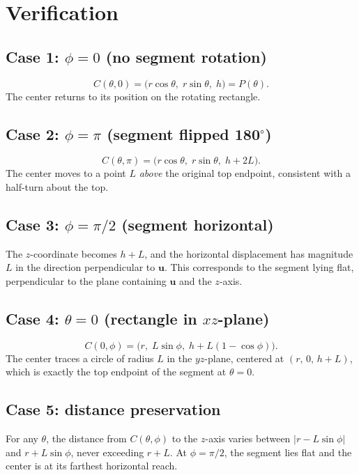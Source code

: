 \documentclass[12pt,a4paper]{article}
\begin{document}
\section{Verification}\label{sec:verify}

\subsection*{Case 1: $\phi = 0$ (no segment rotation)}

\[
C(\theta, 0) = \big( r\cos\theta,\; r\sin\theta,\; h \big) = P(\theta).
\]
The center returns to its position on the rotating rectangle. 

\subsection*{Case 2: $\phi = \pi$ (segment flipped 180$^\circ$)}

\[
C(\theta, \pi) = \big( r\cos\theta,\; r\sin\theta,\; h+2L \big).
\]
The center moves to a point $L$ \emph{above} the original top endpoint,
consistent with a half-turn about the top. 

\subsection*{Case 3: $\phi = \pi/2$ (segment horizontal)}

The $z$-coordinate becomes $h + L$, and the horizontal displacement has
magnitude $L$ in the direction perpendicular to $\mathbf{u}$.
This corresponds to the segment lying flat, perpendicular to the plane
containing $\mathbf{u}$ and the $z$-axis. 

\subsection*{Case 4: $\theta = 0$ (rectangle in $xz$-plane)}

\[
C(0, \phi) = \big( r,\; L\sin\phi,\; h + L(1-\cos\phi) \big).
\]
The center traces a circle of radius $L$ in the $yz$-plane, centered at $(r,\,0,\,h+L)$,
which is exactly the top endpoint of the segment at $\theta=0$. 

\subsection*{Case 5: distance preservation}

For any $\theta$, the distance from $C(\theta,\phi)$ to the $z$-axis varies
between $\lvert r-L\sin\phi\rvert$ and $r+L\sin\phi$, never exceeding $r+L$.
At $\phi=\pi/2$, the segment lies flat and the center is at its farthest
horizontal reach. 
\end{document}
